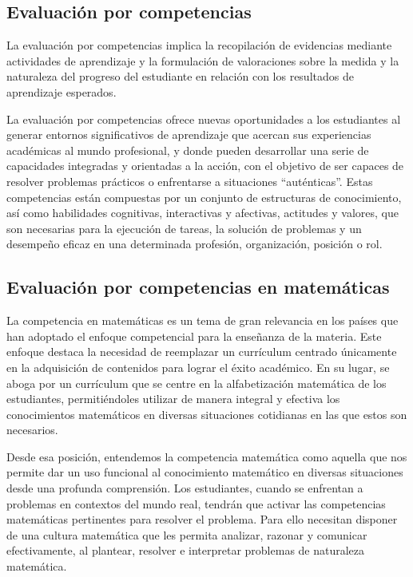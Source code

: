 \subsection{Evaluación por competencias}

La evaluación por competencias implica la recopilación de evidencias mediante actividades de aprendizaje y la formulación de valoraciones sobre la medida y la naturaleza del progreso del estudiante en relación con los resultados de aprendizaje esperados.

La evaluación por competencias ofrece nuevas oportunidades a los estudiantes al generar entornos significativos de aprendizaje que acercan sus experiencias académicas al mundo profesional, y donde pueden desarrollar una serie de capacidades integradas y orientadas a la acción, con el objetivo de ser capaces de resolver problemas prácticos o enfrentarse a situaciones ``auténticas''. Estas competencias están compuestas por un conjunto de estructuras de conocimiento, así como habilidades cognitivas, interactivas y afectivas, actitudes y valores, que son necesarias para la ejecución de tareas, la solución de problemas y un desempeño eficaz en una determinada profesión, organización, posición o rol.

\subsection{Evaluación por competencias en matemáticas}

La competencia en matemáticas es un tema de gran relevancia en los países que han adoptado el enfoque competencial para la enseñanza de la materia. Este enfoque destaca la necesidad de reemplazar un currículum centrado únicamente en la adquisición de contenidos para lograr el éxito académico. En su lugar, se aboga por un currículum que se centre en la alfabetización matemática de los estudiantes, permitiéndoles utilizar de manera integral y efectiva los conocimientos matemáticos en diversas situaciones cotidianas en las que estos son necesarios.

Desde esa posición, entendemos la competencia matemática como aquella que nos permite dar un uso funcional al conocimiento matemático en diversas situaciones desde una profunda comprensión. Los estudiantes, cuando se enfrentan a problemas en contextos del mundo real, tendrán que activar las competencias matemáticas pertinentes para resolver el problema. Para ello necesitan disponer de una cultura matemática que les permita analizar, razonar y comunicar efectivamente, al plantear, resolver e interpretar problemas de naturaleza matemática.

